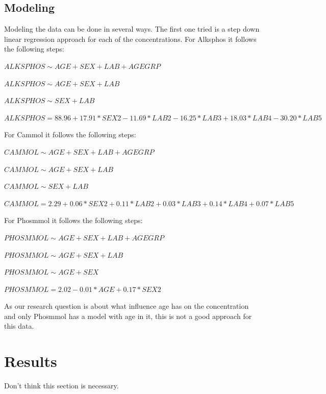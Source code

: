 \documentclass{article}
\begin{document}
    \subsection{Modeling}
      Modeling the data can be done in several ways.
      The first one tried is a step down linear regression approach for each of the concentrations.
      For Alksphos it follows the following steps:
      \begin{itemize}
        \small{\item $ALKSPHOS \sim AGE + SEX + LAB + AGEGRP$}
        \small{\item $ALKSPHOS \sim AGE + SEX + LAB$}
        \small{\item $ALKSPHOS \sim SEX + LAB$}
        \small{\item $ALKSPHOS = 88.96 + 17.91*SEX2 - 11.69*LAB2 - 16.25*LAB3 + 18.03*LAB4 - 30.20*LAB5$}
      \end{itemize}
      For Cammol it follows the following steps:
      \begin{itemize}
        \small{\item $CAMMOL \sim AGE + SEX + LAB + AGEGRP$}
        \small{\item $CAMMOL \sim AGE + SEX + LAB$}
        \small{\item $CAMMOL \sim SEX + LAB$}
        \small{\item $CAMMOL = 2.29 + 0.06*SEX2 + 0.11*LAB2 + 0.03*LAB3 + 0.14*LAB4 + 0.07*LAB5$}
      \end{itemize}
      For Phosmmol it follows the following steps:
      \begin{itemize}
        \small{\item $PHOSMMOL \sim AGE + SEX + LAB + AGEGRP$}
        \small{\item $PHOSMMOL \sim AGE + SEX + LAB$}
        \small{\item $PHOSMMOL \sim AGE + SEX$}
        \small{\item $PHOSMMOL = 2.02 - 0.01*AGE + 0.17*SEX2$}
      \end{itemize}
      As our research question is about what influence age has on the concentration and only Phosmmol has a model with age in it, this is not a good approach for this data.

  \section{Results}
    Don't think this section is necessary.
\end{document}
